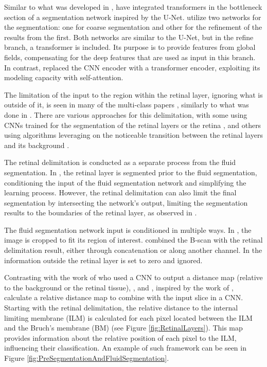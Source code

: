 \par
Similar to what was developed in \parencite{Quek2022}, \textcite{Liu2024} have integrated transformers in the bottleneck section of a segmentation network inspired by the U-Net. \textcite{Liu2024} utilize two networks for the segmentation: one for coarse segmentation and other for the refinement of the results from the first. Both networks are similar to the U-Net, but in the refine branch, a transformer is included. Its purpose is to provide features from global fields, compensating for the deep features that are used as input in this branch. In contrast, \textcite{Zhang2023} replaced the CNN encoder with a transformer encoder, exploiting its modeling capacity with self-attention.
\par
The limitation of the input to the region within the retinal layer, ignoring what is outside of it, is seen in many of the multi-class papers \parencite{Hassan2021b, Hassan2021a, Lu2019, Mantel2021, Rahil2023, Tang2022, Xing2022}, similarly to what was done in \textcite{Pawan2021}. There are various approaches for this delimitation, with some using CNNs trained for the segmentation of the retinal layers or the retina \parencite{Mantel2021, Tang2022}, and others using algorithms leveraging on the noticeable transition between the retinal layers and its background \parencite{Hassan2021b, Hassan2021a, Lu2019, Rahil2023, Xing2022, Pawan2021}. 
\par
The retinal delimitation is conducted as a separate process from the fluid segmentation. In \parencite{Tang2022, Hassan2021b, Hassan2021a, Lu2019, Rahil2023, Xing2022}, the retinal layer is segmented prior to the fluid segmentation, conditioning the input of the fluid segmentation network and simplifying the learning process. However, the retinal delimitation can also limit the final segmentation by intersecting the network's output, limiting the segmentation results to the boundaries of the retinal layer, as observed in \textcite{Mantel2021}.
\par
The fluid segmentation network input is conditioned in multiple ways. In \textcite{Xing2022}, the image is cropped to fit its region of interest. \parencite{Rahil2023, Tang2022, Lu2019} combined the B-scan with the retinal delimitation result, either through concatenation or along another channel. In \parencite{Hassan2021b, Hassan2021a, Pawan2021} the information outside the retinal layer is set to zero and ignored. 
\par
Contrasting with the work of \textcite{Liu2021} who used a CNN to output a distance map (relative to the background or the retinal tissue), \textcite{Tang2022}, and \textcite{Rahil2023}, inspired by the work of \textcite{Lu2019}, calculate a relative distance map to combine with the input slice in a CNN. Starting with the retinal delimitation, the relative distance to the internal limiting membrane (ILM) is calculated for each pixel located between the ILM and the Bruch's membrane (BM) (see Figure \ref{fig:RetinalLayers}). This map provides information about the relative position of each pixel to the ILM, influencing their classification. An example of such framework can be seen in Figure \ref{fig:PreSegmentationAndFluidSegmentation}.
